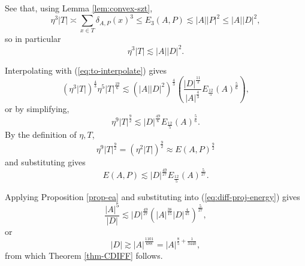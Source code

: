 \documentclass[reqno]{amsart}
\numberwithin{equation}{section}
\begin{document}
See that, using Lemma \ref{lem:convex-szt},
\[
    \eta ^{3} \left\lvert T \right\rvert \asymp \sum _{x \in T} \delta_{A,P} (x)^{3}  \leq E_3(A,P)\lesssim \left\lvert A \right\rvert \left\lvert P \right\rvert ^{2} \leq \left\lvert A \right\rvert \left\lvert D \right\rvert ^{2}  
,\]
so in particular
\[
    \eta^{3}  \left\lvert T \right\rvert \lesssim  \left\lvert A \right\rvert \left\lvert D \right\rvert ^{2}
.\]

Interpolating with (\ref{eq:to-interpolate}) gives
\[
    \left( \eta ^{3} \left\lvert T \right\rvert      \right) ^{\frac{4}{3} } \eta^{5} \left\lvert T \right\rvert ^{\frac{19}{6} } \lesssim \left( \left\lvert A \right\rvert \left\lvert D \right\rvert ^{2} \right) ^{\frac{4}{3} } \left(   \frac{\left\lvert D \right\rvert ^{\frac{11}{2} }}{\left\lvert A \right\rvert ^{\frac{4}{3} }} E_{\frac{12}{5} } (A) ^{\frac{5}{6} }\right) 
,\]
or by simplifying,
\[
    \eta^{9}\left\lvert T \right\rvert ^{\frac{9}{2} }\lesssim \left\lvert D \right\rvert ^{\frac{49}{6} } E_{\frac{12}{5} } (A)^{\frac{5}{6} }
.\]
By the definition of \(\eta, T\),
\[
    \eta^{9} \left\lvert T \right\rvert ^{\frac{9}{2} } = \left( \eta ^{2}\left\lvert T \right\rvert  \right) ^{\frac{9}{2} } \approx E(A,P)^{\frac{9}{2} } 
\]
and substituting gives
\[
    E(A,P)\lesssim \left\lvert D \right\rvert ^{\frac{49}{27} }  E_{\frac{12}{5} } (A)^{\frac{5}{27} } 
.\]

Applying Proposition \ref{prop-ea} and substituting into (\ref{eq:diff-proj-energy}) gives
\[
    \frac{\left\lvert A \right\rvert ^{5}}{\left\lvert D \right\rvert } \lesssim \left\lvert D \right\rvert ^{\frac{49}{27} } \left( \left\lvert A \right\rvert ^{\frac{38}{15} } \left\lvert D \right\rvert ^{\frac{4}{45} } \right) ^{\frac{5}{27} }
,\]
or
\[
    \left\lvert D \right\rvert \gtrsim \left\lvert A \right\rvert ^{\frac{1101}{688} } = \left\lvert A \right\rvert ^{\frac{8}{5}  + \frac{1}{3440}   }
,\]
from which Theorem \ref{thm-CDIFF} follows.

\bigskip



\end{document}
